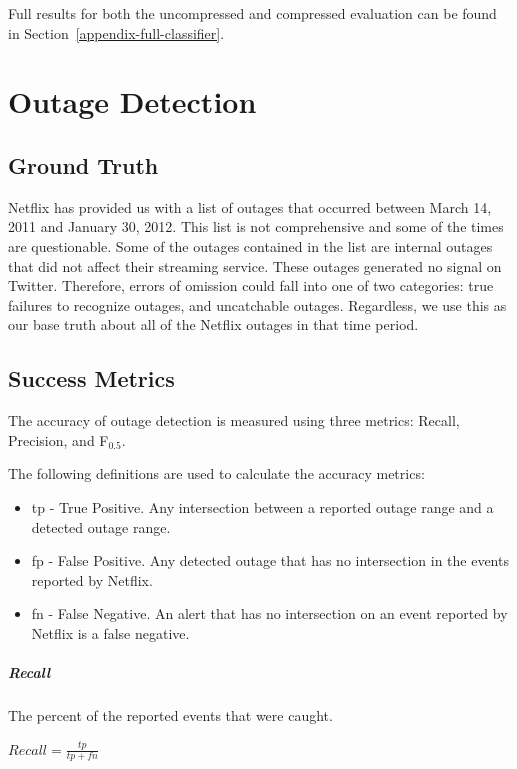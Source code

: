\documentclass[12pt]{ucthesis}
\begin{document}
Full results for both the uncompressed and compressed evaluation can be found in Section~\ref{appendix-full-classifier}.

\part{Outage Detection}
\label{outage-detection}

\chapter{Ground Truth}
\label{outage-detection-truth}
Netflix has provided us with a list of outages that occurred between March 14, 2011 and January 30, 2012.
This list is not comprehensive and some of the times are questionable. Some of the outages contained in the list
are internal outages that did not affect their streaming service. These outages generated no signal on Twitter.
Therefore, errors of omission could fall into one of two categories: true failures to recognize outages, and uncatchable
outages. Regardless, we use this as our base truth about all of the Netflix outages in that time period.

\chapter{Success Metrics}
\label{outage-detection-metrics}
The accuracy of outage detection is measured using three metrics: Recall, Precision, and F$_{0.5}$.

The following definitions are used to calculate the accuracy metrics:
\begin{itemize}
   \item{tp} - True Positive. Any intersection between a reported outage range and a detected outage range.
   \item{fp} - False Positive. Any detected outage that has no intersection in the events reported by Netflix.
   \item{fn} - False Negative. An alert that has no intersection on an event reported by Netflix is a false negative.
\end{itemize}

\subsubsection{Recall}
The percent of the reported events that were caught.
\begin{center}
   $Recall = \frac{tp}{tp + fn}$
\end{center}
\end{document}
